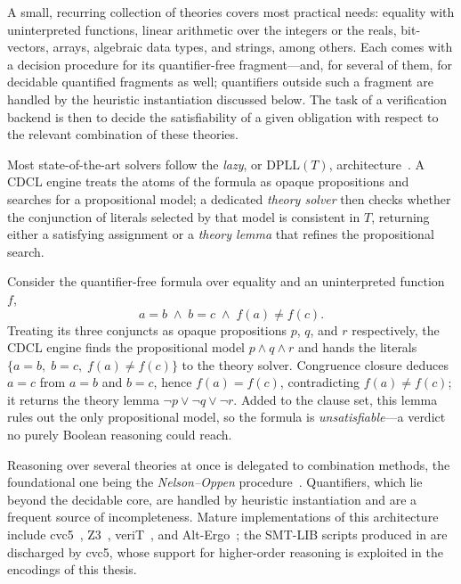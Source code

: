 A small, recurring collection of theories covers most practical needs:
equality with uninterpreted functions, linear arithmetic over the integers or
the reals, bit-vectors, arrays, algebraic data types, and strings, among others.
Each comes with a decision procedure for its quantifier-free fragment---and, for
several of them, for decidable quantified fragments as well; quantifiers outside
such a fragment are handled by the heuristic instantiation discussed below.
The task of a verification backend is then to decide the satisfiability of a
given obligation with respect to the relevant combination of these theories.

Most state-of-the-art solvers follow the \emph{lazy}, or \(\mathrm{DPLL}(T)\),
architecture~\cite{nieuwenhuis2006dpllt}.
A CDCL engine treats the atoms of the formula as opaque propositions and searches
for a propositional model; a dedicated \emph{theory solver} then checks whether
the conjunction of literals selected by that model is consistent in \(T\),
returning either a satisfying assignment or a \emph{theory lemma} that refines the
propositional search.

\begin{example}
Consider the quantifier-free formula over equality and an uninterpreted
function~\(f\),
\[
  a = b \;\land\; b = c \;\land\; f(a) \neq f(c).
\]
Treating its three conjuncts as opaque propositions \(p\), \(q\), and \(r\) respectively,
the CDCL engine finds the propositional model \(p \land q \land r\) and hands the literals
\(\{a = b,\; b = c,\; f(a) \neq f(c)\}\) to the theory solver. Congruence
closure deduces \(a = c\) from \(a = b\) and \(b = c\), hence \(f(a) = f(c)\),
contradicting \(f(a) \neq f(c)\); it returns the theory lemma
\(\lnot p \lor \lnot q \lor \lnot r\). Added to the clause set, this lemma rules
out the only propositional model, so the formula is \emph{unsatisfiable}---a
verdict no purely Boolean reasoning could reach.
\end{example}

Reasoning over several theories at once is delegated to combination methods, the
foundational one being the \emph{Nelson--Oppen} procedure~\cite{nelson1979simplification}.
Quantifiers, which lie beyond the decidable core, are handled by heuristic
instantiation and are a frequent source of incompleteness.
Mature implementations of this architecture include cvc5~\cite{barbosa2022cvc5},
Z3~\cite{demoura2008z3}, veriT~\cite{bouton2009verit}, and Alt-Ergo~\cite{conchon2018altergo}; the
SMT-LIB scripts produced in  are discharged by cvc5, whose support
for higher-order reasoning is exploited in the encodings of this thesis.

